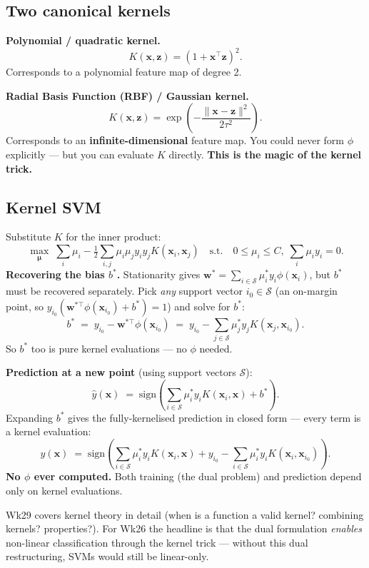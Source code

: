 \documentclass[11pt, a4paper]{article}
\begin{document}
\subsection{Two canonical kernels}

\textbf{Polynomial / quadratic kernel.}
\[
K(\mathbf{x}, \mathbf{z}) = (1 + \mathbf{x}^\top\mathbf{z})^2.
\]
Corresponds to a polynomial feature map of degree 2.

\textbf{Radial Basis Function (RBF) / Gaussian kernel.}
\[
K(\mathbf{x}, \mathbf{z}) = \exp\!\left(-\frac{\|\mathbf{x} - \mathbf{z}\|^2}{2\tau^2}\right).
\]
Corresponds to an \textbf{infinite-dimensional} feature map. You could never form $\phi$ explicitly — but you can evaluate $K$ directly. \textbf{This is the magic of the kernel trick.}

\subsection{Kernel SVM}

Substitute $K$ for the inner product:
\[
\boxed{\;\max_{\boldsymbol\mu}\;\sum_i \mu_i - \tfrac{1}{2}\sum_{i,j}\mu_i\mu_j y_i y_j K(\mathbf{x}_i, \mathbf{x}_j) \quad\text{s.t.}\quad 0 \le \mu_i \le C, \;\sum_i \mu_i y_i = 0.\;}
\]
\textbf{Recovering the bias $b^*$.} Stationarity gives $\mathbf{w}^* = \sum_{i\in\mathcal{S}}\mu_i^* y_i\phi(\mathbf{x}_i)$, but $b^*$ must be recovered separately. Pick \emph{any} support vector $i_0 \in \mathcal{S}$ (an on-margin point, so $y_{i_0}(\mathbf{w}^{*\top}\phi(\mathbf{x}_{i_0}) + b^*) = 1$) and solve for $b^*$:
\[
b^* \;=\; y_{i_0} - \mathbf{w}^{*\top}\phi(\mathbf{x}_{i_0}) \;=\; y_{i_0} - \sum_{j\in\mathcal{S}}\mu_j^* y_j K(\mathbf{x}_j, \mathbf{x}_{i_0}).
\]
So $b^*$ too is pure kernel evaluations — no $\phi$ needed.

\textbf{Prediction at a new point} (using support vectors $\mathcal{S}$):
\[
\hat y(\mathbf{x}) \;=\; \mathrm{sign}\!\left(\sum_{i \in \mathcal{S}} \mu_i^* y_i K(\mathbf{x}_i, \mathbf{x}) + b^*\right).
\]
Expanding $b^*$ gives the fully-kernelised prediction in closed form — every term is a kernel evaluation:
\[
\hat y(\mathbf{x}) \;=\; \mathrm{sign}\!\left(\sum_{i\in\mathcal{S}}\mu_i^* y_i K(\mathbf{x}_i, \mathbf{x}) + y_{i_0} - \sum_{i\in\mathcal{S}}\mu_i^* y_i K(\mathbf{x}_i, \mathbf{x}_{i_0})\right).
\]
\textbf{No $\phi$ ever computed.} Both training (the dual problem) and prediction depend only on kernel evaluations.

Wk29 covers kernel theory in detail (when is a function a valid kernel? combining kernels? properties?). For Wk26 the headline is that the dual formulation \emph{enables} non-linear classification through the kernel trick — without this dual restructuring, SVMs would still be linear-only.
\end{document}
